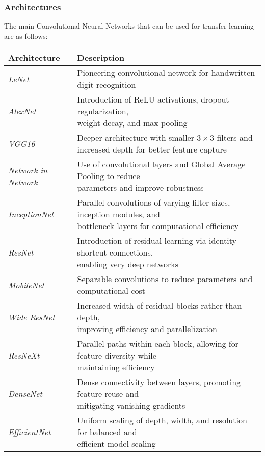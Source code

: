 \subsubsection{Architectures}
The main Convolutional Neural Networks that can be used for transfer learning are as follows: 
\renewcommand*{\arraystretch}{1.5}
\begin{table}[H]
    \centering
    \begin{tabular}{|l|l|}
    \hline
    \textbf{Architecture}    & \textbf{Description}                                                                                   \\ \hline
    \textit{LeNet}           & Pioneering convolutional network for handwritten digit recognition                                           \\ \hline
    \textit{AlexNet}         & \makecell[l]{Introduction of ReLU activations, dropout regularization, \\ weight decay, and max-pooling}                      \\ \hline
    \textit{VGG16}           & \makecell[l]{Deeper architecture with smaller $3 \times 3$ filters and increased depth \\ for better feature capture}         \\ \hline
    \textit{Network in Network} & \makecell[l]{Use of convolutional layers and Global Average Pooling to reduce \\ parameters and improve robustness}  \\ \hline
    \textit{InceptionNet}    & \makecell[l]{Parallel convolutions of varying filter sizes, inception modules, and \\ bottleneck layers for computational efficiency} \\ \hline
    \textit{ResNet}          & \makecell[l]{Introduction of residual learning via identity shortcut connections, \\ enabling very deep networks}             \\ \hline
    \textit{MobileNet}       & Separable convolutions to reduce parameters and computational cost                                           \\ \hline
    \textit{Wide ResNet}     & \makecell[l]{Increased width of residual blocks rather than depth, \\ improving efficiency and parallelization}               \\ \hline
    \textit{ResNeXt}         & \makecell[l]{Parallel paths within each block, allowing for feature diversity while \\ maintaining efficiency}               \\ \hline
    \textit{DenseNet}        & \makecell[l]{Dense connectivity between layers, promoting feature reuse and \\ mitigating vanishing gradients}               \\ \hline
    \textit{EfficientNet}    & \makecell[l]{Uniform scaling of depth, width, and resolution for balanced and \\ efficient model scaling}                    \\ \hline
    \end{tabular}
\end{table}
